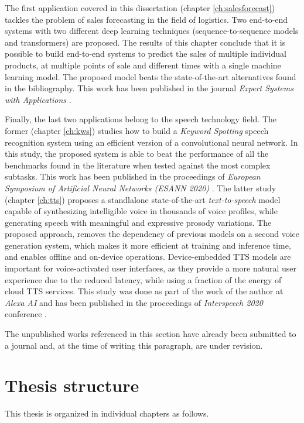 The first application covered in this dissertation (chapter \ref{ch:salesforecast}) tackles the problem of sales forecasting in the field of logistics. Two end-to-end systems with two different deep learning techniques (sequence-to-sequence models and transformers) are proposed. The results of this chapter conclude that it is possible to build end-to-end systems to predict the sales of multiple individual products, at multiple points of sale and different times with a single machine learning model. The proposed model beats the state-of-the-art alternatives found in the bibliography. This work has been published in the journal \textit{Expert Systems with Applications} \autocite{valles2021c}.

Finally, the last two applications belong to the speech technology field. The former (chapter \ref{ch:kws}) studies how to build a \textit{Keyword Spotting} speech recognition system using an efficient version of a convolutional neural network. In this study, the proposed system is able to beat the performance of all the benchmarks found in the literature when tested against the most complex subtasks. This work has been published in the proceedings of \textit{European Symposium of Artificial Neural Networks (ESANN 2020)} \autocite{valles2021a}. The latter study (chapter \ref{ch:tts}) proposes a standlalone state-of-the-art \textit{text-to-speech} model capable of synthesizing intelligible voice in thousands of voice profiles, while generating speech with meaningful and expressive prosody variations. The proposed approach, removes the dependency of previous models on a second voice generation system, which makes it more efficient at training and inference time, and enables offline and on-device operations. Device-embedded TTS models are important for voice-activated user interfaces, as they provide a more natural user experience due to the reduced latency, while using a fraction of the energy of cloud TTS services. This study was done as part of the work of the author at \textit{Alexa AI} and has been published in the proceedings of \textit{Interspeech 2020} conference \autocite{valles2021b}.

The unpublished works referenced in this section have already been submitted to a journal and, at the time of writing this paragraph, are under revision.

\section{Thesis structure}
This thesis is organized in individual chapters as follows.


